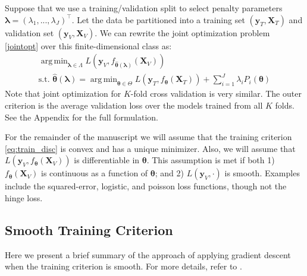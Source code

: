\documentclass[12pt]{article}
\DeclareMathOperator*{\argmin}{arg\,min}
\begin{document}
Suppose that we use a training/validation split to select penalty parameters $\boldsymbol{\lambda} = (\lambda_1, ..., \lambda_J)^\top$. Let the data be partitioned into a training set $(\boldsymbol{y}_T , \boldsymbol{X}_T)$ and validation set $(\boldsymbol{y}_V, \boldsymbol{X}_V)$. We can rewrite the joint optimization problem \eqref{jointopt} over this finite-dimensional class as:
\begin{equation}
\begin{array}{c}
\argmin_{\boldsymbol{\lambda} \in \Lambda} L(\boldsymbol{y}_V, f_{\hat{\boldsymbol \theta}(\boldsymbol{\lambda})}(\boldsymbol{X}_V)) \\
\text{s.t. } {\hat{\boldsymbol \theta}(\boldsymbol{\lambda})} = \argmin_{\boldsymbol \theta \in \Theta} L(\boldsymbol{y}_T, f_{\boldsymbol \theta} (\boldsymbol{X}_T)) + \sum\limits_{i=1}^J \lambda_i P_i(\boldsymbol \theta)
\end{array}
\label{jointopt2}
\end{equation}
Note that joint optimization for $K$-fold cross validation is very similar. The outer criterion is the average validation loss over the models trained from all $K$ folds. See the Appendix for the full formulation.

For the remainder of the manuscript we will assume that the training criterion \eqref{eq:train_disc} is convex and has a unique minimizer. Also, we will assume that $L \left( \boldsymbol{y}_V, f_{\boldsymbol \theta}(\boldsymbol{X}_V) \right)$ is differentiable in $\boldsymbol \theta$. This assumption is met if both 1) $f_{\boldsymbol \theta}(\boldsymbol{X}_V)$ is continuous as a function of $\boldsymbol \theta$; and 2) $L\left(\boldsymbol{y}_V,\cdot\right)$ is smooth. Examples include the squared-error, logistic, and poisson loss functions, though not the hinge loss.

\subsection{Smooth Training Criterion}
Here we present a brief summary of the approach of applying gradient descent when the training criterion is smooth. For more details, refer to \citet{bengio2000gradient}.
\end{document}
